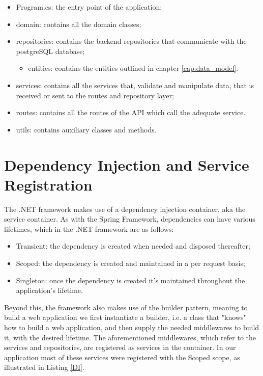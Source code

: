 \begin{itemize}
	\item Program.cs: the entry point of the application;
	\item domain: contains all the domain classes;
	\item repositories: contains the backend repositories that communicate with the postgreSQL database;
	\begin{itemize}
		\item entities: contains the entities outlined in chapter \ref{cap:data_model}.
	\end{itemize}
	\item services: contains all the services that, validate and manipulate data, that is received or sent to the routes and repository layer;
	\item routes: contains all the routes of the API which call the adequate service.
	\item utils: contains auxiliary classes and methods.
\end{itemize}

\section{Dependency Injection and Service Registration}

The .NET framework makes use of a dependency injection container, aka the service container. As with the Spring Framework, dependencies can have various lifetimes, which in the .NET framework are as follows:
\begin{itemize}
	\item Transient: the dependency is created when needed and disposed thereafter;
	\item Scoped: the dependency is created and maintained in a per request basis;
	\item Singleton: once the dependency is created it's maintained throughout the application's lifetime. 
\end{itemize}
Beyond this, the framework also makes use of the builder pattern, meaning to build a web application we first instantiate a builder, i.e. a class that "knows" how to build a web application, and then supply the needed middlewares to build it, with the desired lifetime.
The aforementioned middlewares, which refer to the services and repositories, are registered as services in the container. In our application most of these services were registered with the Scoped scope, as illustrated in Listing \ref{DI}.

